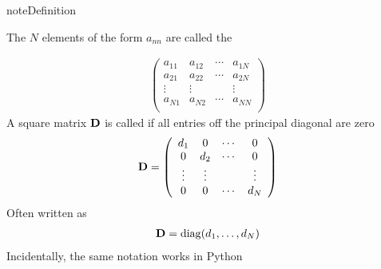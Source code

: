\documentclass[letterpaper,10pt,english]{jupyterBook}
\begin{document}
\begin{sphinxadmonition}{note}{Definition}

\sphinxAtStartPar
The \(N\) elements of the form \(a_{nn}\) are called the 
\end{sphinxadmonition}
\begin{equation*}
\begin{split}
%
\left(
\begin{array}{cccc}
a_{11} & a_{12} & \cdots & a_{1N} \\
a_{21} & a_{22} & \cdots & a_{2N} \\
\vdots & \vdots & & \vdots \\
a_{N1} & a_{N2} & \cdots & a_{NN} \\
\end{array}
\right)
%
\end{split}
\end{equation*}
\sphinxAtStartPar
A square matrix \({\bf D}\) is called  if all entries off the
principal diagonal are zero
\begin{equation*}
\begin{split}
%
{\bf D} = 
\left(
\begin{array}{cccc}
d_1 & 0 & \cdots & 0 \\
0 & d_2 & \cdots & 0 \\
\vdots & \vdots & & \vdots \\
0 & 0 & \cdots & d_N \\
\end{array}
\right)
%
\end{split}
\end{equation*}
\sphinxAtStartPar
Often written as
\begin{equation*}
\begin{split}
%
{\bf D} = \mathrm{diag}(d_1, \ldots, d_N) 
%
\end{split}
\end{equation*}
\sphinxAtStartPar
Incidentally, the same notation works in Python
\end{document}
